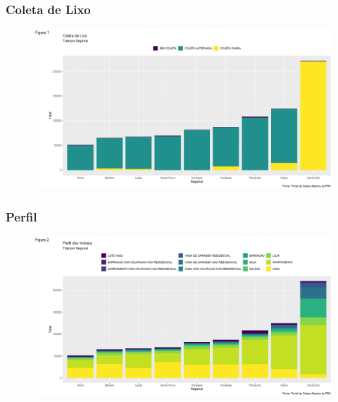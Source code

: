 \begin{frame}

    \frametitle{Coleta de Lixo}
    \begin{figure}[!htbp]
                \centering
       	    \includegraphics[scale=0.35]{imagens/coleta.png}
            \end{figure}

\end{frame}
\begin{frame}

    \frametitle{Perfil}
    \begin{figure}[!htbp]
                \centering
       	    \includegraphics[scale=0.35]{imagens/perfil.png}
            \end{figure}

\end{frame}

